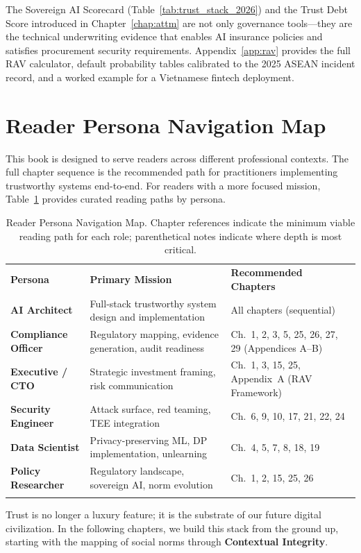 The Sovereign AI Scorecard (Table~\ref{tab:trust_stack_2026}) and the Trust Debt Score introduced in Chapter~\ref{chap:attm} are not only governance tools---they are the technical underwriting evidence that enables AI insurance policies and satisfies procurement security requirements. Appendix~\ref{app:rav} provides the full RAV calculator, default probability tables calibrated to the 2025 ASEAN incident record, and a worked example for a Vietnamese fintech deployment.

\section{Reader Persona Navigation Map}
\label{sec:reader_personas}

This book is designed to serve readers across different professional contexts. The full chapter sequence is the recommended path for practitioners implementing trustworthy systems end-to-end. For readers with a more focused mission, Table~\ref{tab:reader_map} provides curated reading paths by persona.

\begin{table}[ht]
\centering
\caption{Reader Persona Navigation Map. Chapter references indicate the minimum viable reading path for each role; parenthetical notes indicate where depth is most critical.}
\label{tab:reader_map}
\renewcommand{\arraystretch}{1.3}
\begin{tabular}{p{3.0cm} p{4.5cm} p{5.0cm}}
\hline\noalign{\smallskip}
\textbf{Persona} & \textbf{Primary Mission} & \textbf{Recommended Chapters} \\
\noalign{\smallskip}\svhline\noalign{\smallskip}
\textbf{AI Architect} & Full-stack trustworthy system design and implementation & All chapters (sequential) \\[3pt]
\textbf{Compliance Officer} & Regulatory mapping, evidence generation, audit readiness & Ch.~1, 2, 3, 5, 25, 26, 27, 29 (Appendices A--B) \\[3pt]
\textbf{Executive / CTO} & Strategic investment framing, risk communication & Ch.~1, 3, 15, 25, Appendix~A (RAV Framework) \\[3pt]
\textbf{Security Engineer} & Attack surface, red teaming, TEE integration & Ch.~6, 9, 10, 17, 21, 22, 24 \\[3pt]
\textbf{Data Scientist} & Privacy-preserving ML, DP implementation, unlearning & Ch.~4, 5, 7, 8, 18, 19 \\[3pt]
\textbf{Policy Researcher} & Regulatory landscape, sovereign AI, norm evolution & Ch.~1, 2, 15, 25, 26 \\
\noalign{\smallskip}\hline\noalign{\smallskip}
\end{tabular}
\end{table}

Trust is no longer a luxury feature; it is the substrate of our future digital civilization. In the following chapters, we build this stack from the ground up, starting with the mapping of social norms through \textbf{Contextual Integrity}.
